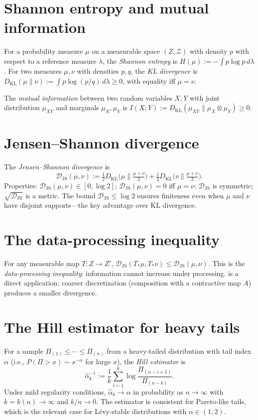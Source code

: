 \documentclass[12pt, oneside]{memoir}
\newcommand{\Djs}{\mathcal{D}_{\mathrm{JS}}}
\newcommand{\KL}{D_{\mathrm{KL}}}
\begin{document}
\section{Shannon entropy and mutual information}

For a probability measure $\mu$ on a measurable space $(Z, \mathcal{Z})$ with density
$p$ with respect to a reference measure $\lambda$, the \emph{Shannon entropy} is
$H(\mu) := -\int p \log p\, d\lambda$.  For two measures $\mu, \nu$ with densities
$p, q$, the \emph{KL divergence} is $\KL(\mu \| \nu) := \int p \log(p/q)\, d\lambda
\ge 0$, with equality iff $\mu = \nu$.

The \emph{mutual information} between two random variables $X, Y$ with joint
distribution $\mu_{XY}$ and marginals $\mu_X, \mu_Y$ is
$I(X;Y) := \KL(\mu_{XY} \| \mu_X \otimes \mu_Y) \ge 0$.

\section{Jensen--Shannon divergence}

The \emph{Jensen--Shannon divergence} is
\[
  \Djs(\mu, \nu) := \tfrac{1}{2}\KL\!\bigl(\mu \| \tfrac{\mu+\nu}{2}\bigr) +
                    \tfrac{1}{2}\KL\!\bigl(\nu \| \tfrac{\mu+\nu}{2}\bigr).
\]
Properties: $\Djs(\mu,\nu) \in [0, \log 2]$; $\Djs(\mu,\nu) = 0$ iff $\mu = \nu$;
$\Djs$ is symmetric; $\sqrt{\Djs}$ is a metric.  The bound $\Djs \le \log 2$ ensures
finiteness even when $\mu$ and $\nu$ have disjoint supports---the key advantage over KL
divergence.

\section{The data-processing inequality}

For any measurable map $T: Z \to Z'$,
$\Djs(T_*\mu, T_*\nu) \le \Djs(\mu, \nu)$.  This is the \emph{data-processing
inequality}: information cannot increase under processing.   is a
direct application: coarser discretization (composition with a contractive map $A$)
produces a smaller divergence.

\section{The Hill estimator for heavy tails}

For a sample $\Pi_{(1)} \le \cdots \le \Pi_{(n)}$ from a heavy-tailed distribution with
tail index $\alpha$ (i.e., $P(\Pi > x) \sim x^{-\alpha}$ for large $x$), the
\emph{Hill estimator} is
\[
  \hat\alpha^{-1}_k := \frac{1}{k} \sum_{i=1}^k \log\frac{\Pi_{(n-i+1)}}{\Pi_{(n-k)}}.
\]
Under mild regularity conditions, $\hat\alpha_k \to \alpha$ in probability as $n \to
\infty$ with $k = k(n) \to \infty$ and $k/n \to 0$.  The estimator is consistent for
Pareto-like tails, which is the relevant case for Lévy-stable distributions with
$\alpha \in (1,2)$.
\end{document}
